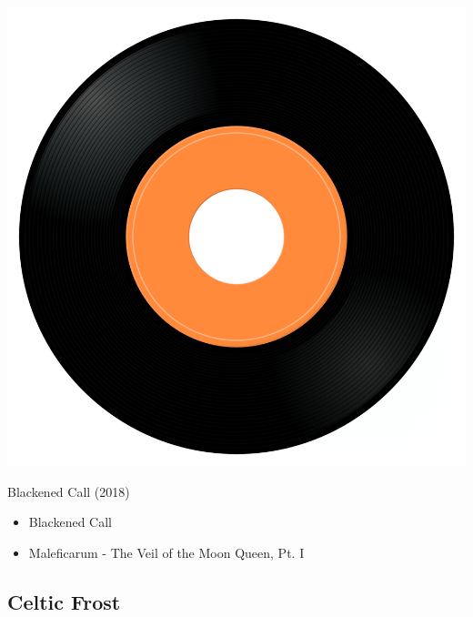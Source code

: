 \begin{minipage}[t]{0.25\textwidth}\vspace{0pt}
\captionsetup{type=figure}
\includegraphics[width=\textwidth]{Images/cover.png}
\caption*{Blackened Call (2018)}
\end{minipage}
\begin{minipage}[t]{0.25\textwidth}\vspace{0pt}
\begin{itemize}[nosep,leftmargin=1em,labelwidth=*,align=left]
	\setlength{\itemsep}{0pt}
	\item Blackened Call
	\item	Maleficarum - The Veil of the Moon Queen, Pt. I
\end{itemize}
\end{minipage}

\subsection{Celtic Frost}

